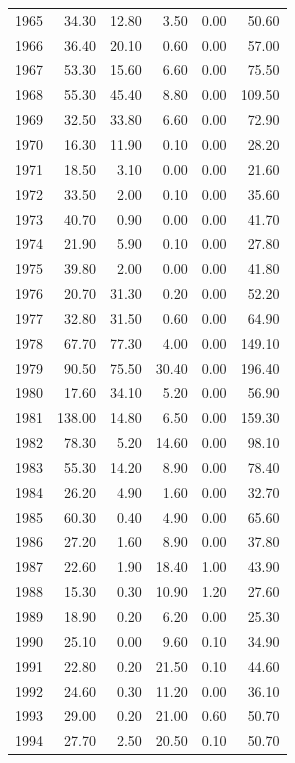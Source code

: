\documentclass[12pt,]{article}
\begin{document}
\begin{longtable}{rrrrrr}
  1965 & 34.30 & 12.80 & 3.50 & 0.00 & 50.60 \\ 
  1966 & 36.40 & 20.10 & 0.60 & 0.00 & 57.00 \\ 
  1967 & 53.30 & 15.60 & 6.60 & 0.00 & 75.50 \\ 
  1968 & 55.30 & 45.40 & 8.80 & 0.00 & 109.50 \\ 
  1969 & 32.50 & 33.80 & 6.60 & 0.00 & 72.90 \\ 
  1970 & 16.30 & 11.90 & 0.10 & 0.00 & 28.20 \\ 
  1971 & 18.50 & 3.10 & 0.00 & 0.00 & 21.60 \\ 
  1972 & 33.50 & 2.00 & 0.10 & 0.00 & 35.60 \\ 
  1973 & 40.70 & 0.90 & 0.00 & 0.00 & 41.70 \\ 
  1974 & 21.90 & 5.90 & 0.10 & 0.00 & 27.80 \\ 
  1975 & 39.80 & 2.00 & 0.00 & 0.00 & 41.80 \\ 
  1976 & 20.70 & 31.30 & 0.20 & 0.00 & 52.20 \\ 
  1977 & 32.80 & 31.50 & 0.60 & 0.00 & 64.90 \\ 
  1978 & 67.70 & 77.30 & 4.00 & 0.00 & 149.10 \\ 
  1979 & 90.50 & 75.50 & 30.40 & 0.00 & 196.40 \\ 
  1980 & 17.60 & 34.10 & 5.20 & 0.00 & 56.90 \\ 
  1981 & 138.00 & 14.80 & 6.50 & 0.00 & 159.30 \\ 
  1982 & 78.30 & 5.20 & 14.60 & 0.00 & 98.10 \\ 
  1983 & 55.30 & 14.20 & 8.90 & 0.00 & 78.40 \\ 
  1984 & 26.20 & 4.90 & 1.60 & 0.00 & 32.70 \\ 
  1985 & 60.30 & 0.40 & 4.90 & 0.00 & 65.60 \\ 
  1986 & 27.20 & 1.60 & 8.90 & 0.00 & 37.80 \\ 
  1987 & 22.60 & 1.90 & 18.40 & 1.00 & 43.90 \\ 
  1988 & 15.30 & 0.30 & 10.90 & 1.20 & 27.60 \\ 
  1989 & 18.90 & 0.20 & 6.20 & 0.00 & 25.30 \\ 
  1990 & 25.10 & 0.00 & 9.60 & 0.10 & 34.90 \\ 
  1991 & 22.80 & 0.20 & 21.50 & 0.10 & 44.60 \\ 
  1992 & 24.60 & 0.30 & 11.20 & 0.00 & 36.10 \\ 
  1993 & 29.00 & 0.20 & 21.00 & 0.60 & 50.70 \\ 
  1994 & 27.70 & 2.50 & 20.50 & 0.10 & 50.70 \\ 

\end{longtable}
\end{document}
